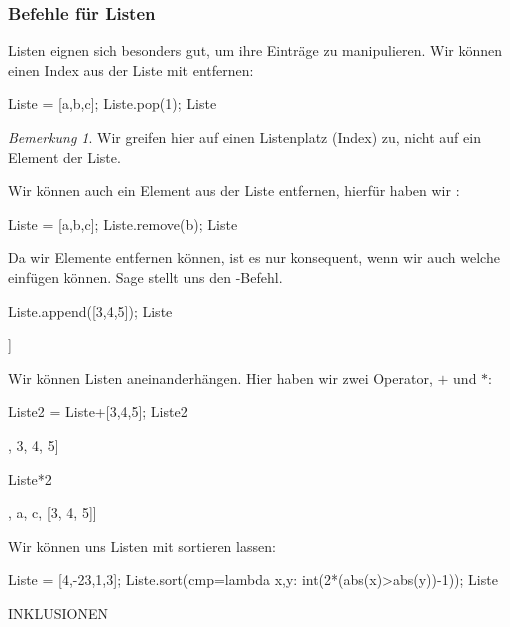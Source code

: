 \documentclass[fontsize=12pt,paper=a4,twoside,bibtotoc,idxtotoc,
liststotoc,pagesize,BCOR1.2cm,DIV15,chapterprefix,pagesize=pdftex]{scrbook}
\theoremstyle{plain}
\theoremstyle{definition}
\theoremstyle{remark}
\newtheorem{bem}[equation]{Bemerkung}
\begin{document}
\subsubsection{Befehle für Listen}
Listen eignen sich besonders gut, um ihre Einträge zu manipulieren.
Wir können einen Index aus der Liste mit  entfernen:
\begin{sagein}
Liste = [a,b,c]; Liste.pop(1); Liste 
\end{sagein}
\begin{sage}
  [a, c]
\end{sage}
\begin{bem}
 Wir greifen hier auf einen Listenplatz (Index) zu, nicht auf ein Element der Liste.
\end{bem}
Wir können auch ein Element aus der Liste entfernen, hierfür haben wir :
\begin{sagein}
Liste = [a,b,c]; Liste.remove(b); Liste
\end{sagein}
\begin{sage}
  [a, c]
\end{sage}
Da wir Elemente entfernen können, ist es nur konsequent, wenn wir auch welche einfügen können. Sage stellt uns den -Befehl.
\begin{sagein}
Liste.append([3,4,5]); Liste
\end{sagein}
\begin{sage}
[a, c, [3, 4, 5]]
\end{sage}
Wir können Listen aneinanderhängen. Hier haben wir zwei Operator, $+$ und $*$:
\begin{sagein}
Liste2 = Liste+[3,4,5]; Liste2
\end{sagein}
\begin{sage}
[a, c, [3, 4, 5], 3, 4, 5]
\end{sage}
\begin{sagein}
Liste*2
\end{sagein}
\begin{sage}
 [a, c, [3, 4, 5], a, c, [3, 4, 5]]
\end{sage}
Wir können uns Listen mit  sortieren lassen:
\begin{sagein}
Liste = [4,-23,1,3]; Liste.sort(cmp=lambda x,y: int(2*(abs(x)>abs(y))-1)); Liste
\end{sagein}
\begin{sage}
[1, 3, 4, -23]
\end{sage}

INKLUSIONEN
\end{document}
